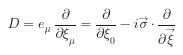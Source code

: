 \begin{equation}
D= e_{\mu} ~\frac{\partial}{\partial \xi_{\mu}} = \frac{\partial}{\partial \xi_{0}} -
i\vec{\sigma} \cdot \frac{\partial}{\partial \vec{\xi}}
\end{equation}

